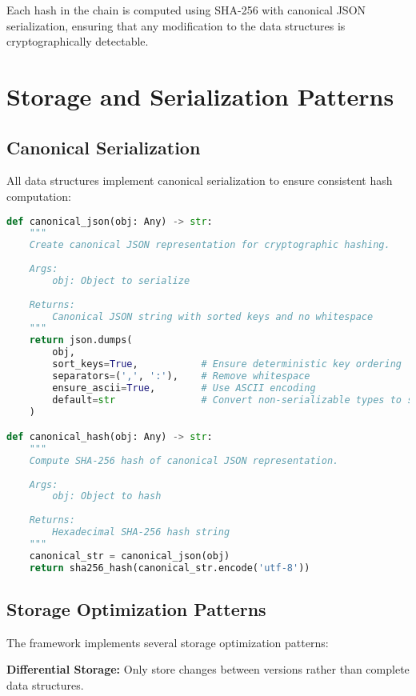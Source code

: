 \documentclass[12pt,a4paper]{article}
\begin{document}
Each hash in the chain is computed using SHA-256 with canonical JSON serialization, ensuring that any modification to the data structures is cryptographically detectable.

\newpage

\section{Storage and Serialization Patterns}

\subsection{Canonical Serialization}

All data structures implement canonical serialization to ensure consistent hash computation:

\begin{lstlisting}[language=Python, caption=Canonical JSON Serialization]
def canonical_json(obj: Any) -> str:
    """
    Create canonical JSON representation for cryptographic hashing.
    
    Args:
        obj: Object to serialize
        
    Returns:
        Canonical JSON string with sorted keys and no whitespace
    """
    return json.dumps(
        obj,
        sort_keys=True,           # Ensure deterministic key ordering
        separators=(',', ':'),    # Remove whitespace
        ensure_ascii=True,        # Use ASCII encoding
        default=str               # Convert non-serializable types to strings
    )

def canonical_hash(obj: Any) -> str:
    """
    Compute SHA-256 hash of canonical JSON representation.
    
    Args:
        obj: Object to hash
        
    Returns:
        Hexadecimal SHA-256 hash string
    """
    canonical_str = canonical_json(obj)
    return sha256_hash(canonical_str.encode('utf-8'))
\end{lstlisting}

\subsection{Storage Optimization Patterns}

The framework implements several storage optimization patterns:

\textbf{Differential Storage:} Only store changes between versions rather than complete data structures.
\end{document}
